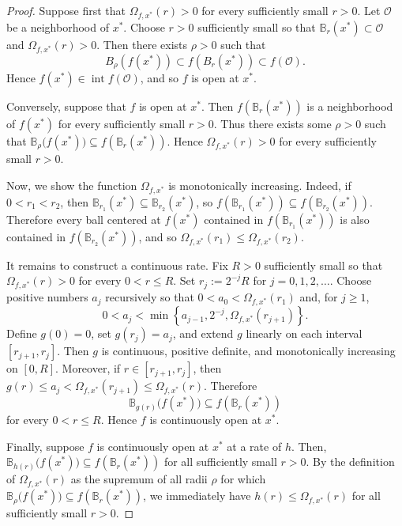 \documentclass[pdflatex,sn-mathphys-num]{sn-jnl}%
\theoremstyle{thmstyleone}%
\theoremstyle{thmstyletwo}%
\theoremstyle{thmstylethree}%
\begin{document}

    \begin{proof}
        Suppose first that \(\Omega_{f,x^*}(r)>0\) for every sufficiently small \(r>0\).  Let $\mathcal{O}$ be a neighborhood of \(x^*\). Choose \(r>0\) sufficiently small so that $\mathbb{B}_r(x^*)\subset \mathcal{O}$ and $\Omega_{f,x^*}(r)>0$. Then there exists $\rho>0$ such that
        \[
            B_\rho(f(x^*))\subset f(B_r(x^*))\subset f(\mathcal{O}).
        \]
        Hence \(f(x^*)\in \operatorname{int} f(\mathcal{O})\), and so \(f\) is open at \(x^*\).

        Conversely, suppose that $f$ is open at $x^*$.  Then $f(\mathbb{B}_r(x^*))$ is a neighborhood of $f(x^*)$ for every sufficiently small $r>0$.  Thus there exists some $\rho>0$ such that $\mathbb{B}_{\rho}\big(f(x^*)\big)\subseteq f(\mathbb{B}_r(x^*))$.  Hence $\Omega_{f,x^*}(r)>0$ for every sufficiently small $r>0$.

        Now, we show the function $\Omega_{f,x^*}$ is monotonically increasing.  Indeed, if $0<r_1<r_2$, then $\mathbb{B}_{r_1}(x^*)\subseteq \mathbb{B}_{r_2}(x^*)$, so $f(\mathbb{B}_{r_1}(x^*))\subseteq f(\mathbb{B}_{r_2}(x^*))$.  Therefore every ball centered at $f(x^*)$ contained in $f(\mathbb{B}_{r_1}(x^*))$ is also contained in $f(\mathbb{B}_{r_2}(x^*))$, and so $\Omega_{f,x^*}(r_1)\leq \Omega_{f,x^*}(r_2)$.

        It remains to construct a continuous rate.  Fix $R>0$ sufficiently small so that $\Omega_{f,x^*}(r)>0$ for every $0<r\leq R$.  Set $r_j:=2^{-j}R$ for $j=0,1,2,\ldots$.  Choose positive numbers $a_j$ recursively so that $0<a_0<\Omega_{f,x^*}(r_1)$ and, for $j\geq 1$,
        $$
            0<a_j<\min\left\{a_{j-1},2^{-j},\Omega_{f,x^*}(r_{j+1})\right\}.
        $$
        Define $g(0)=0$, set $g(r_j)=a_j$, and extend $g$ linearly on each interval $[r_{j+1},r_j]$.  Then $g$ is continuous, positive definite, and monotonically increasing on $[0,R]$.  Moreover, if $r\in [r_{j+1},r_j]$, then $g(r)\leq a_j<\Omega_{f,x^*}(r_{j+1})\leq \Omega_{f,x^*}(r)$.  Therefore
        $$
            \mathbb{B}_{g(r)}\big(f(x^*)\big)\subseteq f(\mathbb{B}_r(x^*))
        $$
        for every $0<r\leq R$.  Hence $f$ is continuously open at $x^*$.

        Finally, suppose $f$ is continuously open at $x^*$ at a rate of $h$.  Then, $\mathbb{B}_{h(r)}\big(f(x^*)\big)\subseteq f(\mathbb{B}_r(x^*))$ for all sufficiently small $r>0$.  By the definition of $\Omega_{f,x^*}(r)$ as the supremum of all radii $\rho$ for which $\mathbb{B}_{\rho}\big(f(x^*)\big)\subseteq f(\mathbb{B}_r(x^*))$, we immediately have $h(r)\leq \Omega_{f,x^*}(r)$ for all sufficiently small $r>0$.
    \end{proof}
    
\end{document}
